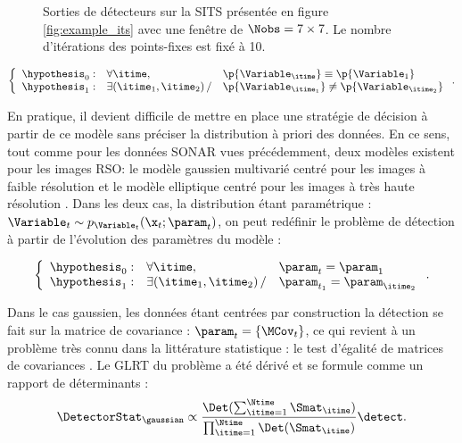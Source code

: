 \begin{figure}[t]
  
  
  \vspace{-1em}
  \caption{Sorties de détecteurs sur la SITS présentée en figure \ref{fig:example_its} avec une fenêtre de $\Nobs=7\times 7$. Le nombre d'itérations des points-fixes est fixé à 10.}
  \label{fig:cd_maps}
\end{figure}



\begin{equation}
  \left\{ \begin{array}{lll} \hypothesis_0: &  \forall \itime, & \p{\Variable_\itime} \equiv \p{\Variable_1}   \\ 
  \hypothesis_1: & \exists (\itime_1, \itime_2)\, / & \p{\Variable_{\itime_1}} \not\equiv  \p{\Variable_{\itime_2}}  \end{array}\right. .
\end{equation}

En pratique, il devient difficile de mettre en place une stratégie de décision à partir de ce modèle sans préciser la distribution à priori des données. En ce sens, tout comme pour les données SONAR vues précédemment, deux modèles existent pour les images RSO: le modèle gaussien multivarié centré pour les images à faible résolution \cite{lee2017polarimetric} et le modèle elliptique centré pour les images à très haute résolution \cite{413444, greco2007statistical}. Dans les deux cas, la distribution étant paramétrique : $\Variable_t \sim p_{\Variable_t}(\x_t;\param_t)$, on peut redéfinir le problème de détection à partir de l'évolution des paramètres du modèle :

\begin{equation}
  \left\{ \begin{array}{lll} \hypothesis_0: &  \forall \itime, & \param_t = \param_1   \\ 
  \hypothesis_1: & \exists (\itime_1, \itime_2)\, / & \param_{t_1} = \param_{\itime_2} \end{array}\right. .
\end{equation}

Dans le cas gaussien, les données étant centrées par construction la détection se fait sur la matrice de covariance : $\param_t = \{\MCov_t\}$, ce qui revient à un problème très connu dans la littérature statistique : le test d'égalité de matrices de covariances \cite{anderson1958introduction}. Le GLRT du problème a été dérivé et se formule comme un rapport de déterminants :
\begin{equation}
  \DetectorStat_\gaussian \propto \dfrac{\Det(\sum_{\itime=1}^{\Ntime} \Smat_\itime)}{\prod_{\itime=1}^{\Ntime} \Det(\Smat_\itime)} \detect .
  \label{eq:glrt_gaussian_cd}
\end{equation}


